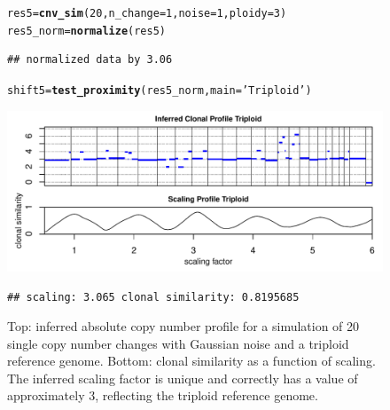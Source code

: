 \documentclass[12pt]{article}\usepackage[]{graphicx}\usepackage[]{color}
\makeatletter
\newcommand{\hlnum}[1]{\textcolor[rgb]{0.686,0.059,0.569}{#1}}%
\newcommand{\hlstr}[1]{\textcolor[rgb]{0.192,0.494,0.8}{#1}}%
\newcommand{\hlstd}[1]{\textcolor[rgb]{0.345,0.345,0.345}{#1}}%
\newcommand{\hlkwb}[1]{\textcolor[rgb]{0.69,0.353,0.396}{#1}}%
\newcommand{\hlkwc}[1]{\textcolor[rgb]{0.333,0.667,0.333}{#1}}%
\newcommand{\hlkwd}[1]{\textcolor[rgb]{0.737,0.353,0.396}{\textbf{#1}}}%
\newenvironment{kframe}{%
 \def\at@end@of@kframe{}%
 \ifinner\ifhmode%
  \def\at@end@of@kframe{\end{minipage}}%
  \begin{minipage}{\columnwidth}%
 \fi\fi%
 \def\FrameCommand##1{\hskip\@totalleftmargin \hskip-\fboxsep
 \colorbox{shadecolor}{##1}\hskip-\fboxsep
     \hskip-\linewidth \hskip-\@totalleftmargin \hskip\columnwidth}%
 \MakeFramed {\advance\hsize-\width
   \@totalleftmargin\z@ \linewidth\hsize
   \@setminipage}}%
 {\par\unskip\endMakeFramed%
 \at@end@of@kframe}
\newenvironment{knitrout}{}{} %
\makeatother
\begin{document}
\begin{figure}[h!]
  \centering
\begin{knitrout}
\color{fgcolor}\begin{kframe}
\begin{alltt}
\hlstd{res5} \hlkwb{=} \hlkwd{cnv_sim} \hlstd{(}\hlnum{20}\hlstd{,} \hlkwc{n_change} \hlstd{=} \hlnum{1}\hlstd{,} \hlkwc{noise} \hlstd{=} \hlnum{1}\hlstd{,} \hlkwc{ploidy}\hlstd{=}\hlnum{3}\hlstd{)}
\hlstd{res5_norm} \hlkwb{=} \hlkwd{normalize}\hlstd{(res5)}
\end{alltt}
\begin{verbatim}
## normalized data by 3.06
\end{verbatim}
\begin{alltt}
\hlstd{shift5} \hlkwb{=} \hlkwd{test_proximity}\hlstd{(res5_norm,} \hlkwc{main} \hlstd{=} \hlstr{'Triploid'}\hlstd{)}
\end{alltt}
\end{kframe}
\includegraphics[width=.95\linewidth]{figure/unnamed-chunk-11-1} 
\begin{kframe}\begin{verbatim}
## scaling: 3.065 clonal similarity: 0.8195685
\end{verbatim}
\end{kframe}
\end{knitrout}
\caption{Top: inferred absolute copy number profile for a simulation of 20 single copy number changes with Gaussian noise and a triploid reference genome. Bottom: clonal similarity as a function of scaling. The inferred scaling factor is unique and correctly has a value of approximately 3, reflecting the triploid reference genome.}
\label{fig:triploid}
\end{figure}

\newpage
\end{document}
